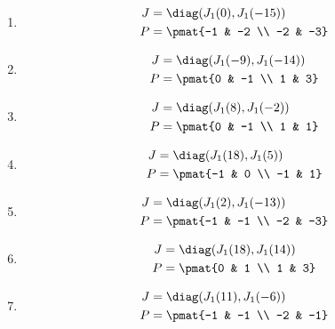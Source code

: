\begin{enumerate}

\item

\begin{align*}
J &= \diag(J_{1}(0), J_{1}(-15))\\
P &= \pmat{-1 & -2 \\ -2 & -3}
\end{align*}

\item

\begin{align*}
J &= \diag(J_{1}(-9), J_{1}(-14))\\
P &= \pmat{0 & -1 \\ 1 & 3}
\end{align*}

\item

\begin{align*}
J &= \diag(J_{1}(8), J_{1}(-2))\\
P &= \pmat{0 & -1 \\ 1 & 1}
\end{align*}

\item

\begin{align*}
J &= \diag(J_{1}(18), J_{1}(5))\\
P &= \pmat{-1 & 0 \\ -1 & 1}
\end{align*}

\item

\begin{align*}
J &= \diag(J_{1}(2), J_{1}(-13))\\
P &= \pmat{-1 & -1 \\ -2 & -3}
\end{align*}

\item

\begin{align*}
J &= \diag(J_{1}(18), J_{1}(14))\\
P &= \pmat{0 & 1 \\ 1 & 3}
\end{align*}

\item

\begin{align*}
J &= \diag(J_{1}(11), J_{1}(-6))\\
P &= \pmat{-1 & -1 \\ -2 & -1}
\end{align*}


\end{enumerate}
